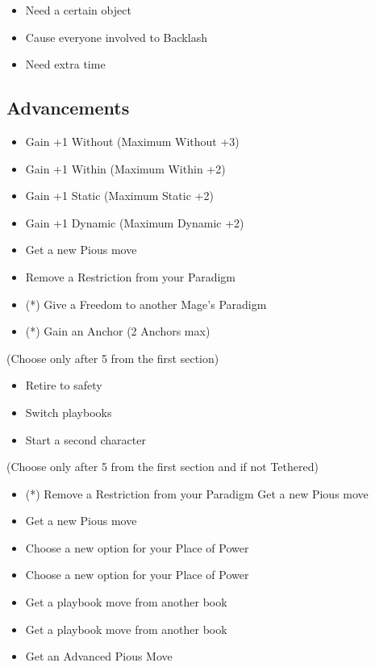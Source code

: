 \documentclass[
  oneside,
  statementpaper,
  9pt]{memoir}
\begin{document}
\begin{itemize}
\tightlist
\item
  Need a certain object
\item
  Cause everyone involved to Backlash
\item
  Need extra time
\end{itemize}

\hypertarget{advancements-4}{%
\subsection{Advancements}\label{advancements-4}}

\begin{itemize}
\tightlist
\item
  Gain +1 Without (Maximum Without +3)
\item
  Gain +1 Within (Maximum Within +2)
\item
  Gain +1 Static (Maximum Static +2)
\item
  Gain +1 Dynamic (Maximum Dynamic +2)
\item
  Get a new Pious move
\item
  Remove a Restriction from your Paradigm
\item
  (*) Give a Freedom to another Mage's Paradigm
\item
  (*) Gain an Anchor (2 Anchors max)
\end{itemize}

(Choose only after 5 from the first section)

\begin{itemize}
\tightlist
\item
  Retire to safety
\item
  Switch playbooks
\item
  Start a second character
\end{itemize}

(Choose only after 5 from the first section and if not Tethered)

\begin{itemize}
\tightlist
\item
  (*) Remove a Restriction from your Paradigm Get a new Pious move
\item
  Get a new Pious move
\item
  Choose a new option for your Place of Power
\item
  Choose a new option for your Place of Power
\item
  Get a playbook move from another book
\item
  Get a playbook move from another book
\item
  Get an Advanced Pious Move
\end{itemize}
\end{document}
